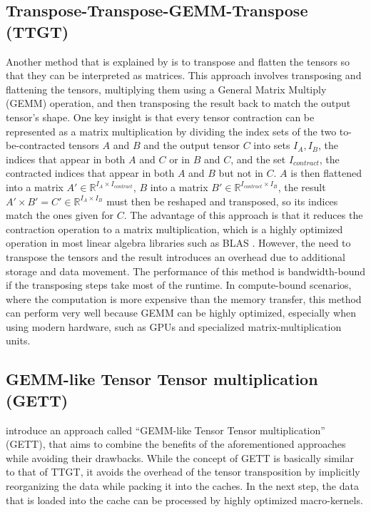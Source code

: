 \subsection{Transpose-Transpose-GEMM-Transpose (TTGT)}
Another method that is explained by \textcite{springer} is to transpose and flatten the tensors so that they can be interpreted as matrices. This approach involves transposing and flattening the tensors, multiplying them using a General Matrix Multiply (GEMM) operation, and then transposing the result back to match the output tensor's shape. 
One key insight is that every tensor contraction can be represented as a matrix multiplication by dividing the index sets of the two to-be-contracted tensors $A$ and $B$ and the output tensor $C$ into sets $I_A, I_B$, the indices that appear in both $A$ and $C$ or in $B$ and $C$, and the set $I_{contract}$, the contracted indices that appear in both $A$ and $B$ but not in $C$. $A$ is then flattened into a matrix $A' \in \mathbb{R}^{I_A\times I_{contract}}$, $B$ into a matrix $B' \in \mathbb{R}^{I_{contract} \times I_B}$, the result $A'\times B' = C' \in \mathbb{R}^{I_A\times I_B}$ must then be reshaped and transposed, so its indices match the ones given for $C$.
The advantage of this approach is that it reduces the contraction operation to a matrix multiplication, which is a highly optimized operation in most linear algebra libraries such as BLAS \cite{BLAS}. However, the need to transpose the tensors and the result introduces an overhead due to additional storage and data movement. The performance of this method is bandwidth-bound if the transposing steps take most of the runtime. In compute-bound scenarios, where the computation is more expensive than the memory transfer, this method can perform very well because GEMM can be highly optimized, especially when using modern hardware, such as GPUs and specialized matrix-multiplication units.

\subsection{GEMM-like Tensor Tensor multiplication (GETT)}\label{gemm}
\noindent \textcite{springer} introduce an approach called ``GEMM-like Tensor Tensor multiplication'' (GETT), that aims to combine the benefits of the aforementioned approaches while avoiding their drawbacks. 
While the concept of GETT is basically similar to that of TTGT, it avoids the overhead of the tensor transposition by implicitly reorganizing the data while packing it into the caches. In the next step, the data that is loaded into the cache can be processed by highly optimized macro-kernels.


